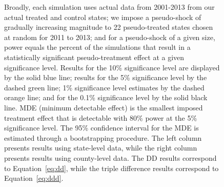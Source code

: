 \documentclass[12pt]{article}%
\begin{document}
\begin{figure}
\begin{minipage}{\linewidth}
\begin{justify}
{                Broadly, each simulation uses actual data from 2001-2013 from our actual treated and control states; we impose a pseudo-shock of gradually increasing magnitude to 22 pseudo-treated states chosen at random for 2011 to 2013; 
                and for a pseudo-shock of a given size, power equals the percent of the simulations that result in a statistically significant pseudo-treatment effect at a given significance level. 
                Results for the 10\% significance level are displayed by the solid blue line; results for the 5\% significance level by the dashed green line; 1\% significance level estimates by the dashed orange line; and for the 0.1\% significance level by the solid black line. 
                MDE (minimum detectable effect) is the smallest imposed treatment effect that is detectable with 80\% power at the 5\% significance level. 
                The 95\% confidence interval for the MDE is estimated through a bootstrapping procedure. 
                The left column presents results using state-level data, while the right column presents results using county-level data. The DD results correspond to Equation~\ref{eq:dd}, while the triple difference results correspond to Equation~\ref{eq:ddd}. 
                \par}
            \end{justify}
    \end{minipage}
    \end{figure}
  
\end{document}
